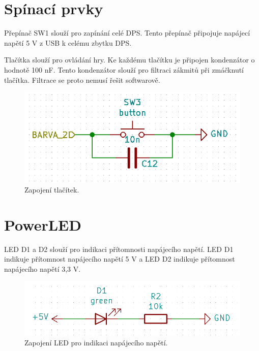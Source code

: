 \section{Spínací prvky}
Přepínač SW1 slouží pro zapínání celé DPS. Tento přepínač připojuje napájecí napětí 5 V z USB k celému zbytku DPS.

Tlačítka slouží pro ovládání hry. Ke každému tlačítku je připojen kondenzátor o hodnotě 100 nF. Tento kondenzátor 
slouží pro filtraci zákmitů při zmáčknutí tlačítka. Filtrace se proto nemusí řešit softwarově.

\begin{figure}[!h]
  \begin{center}
    \includegraphics[scale=0.8]{obrazky/Tlacitka_zapojeni.png}
  \end{center}
  \caption[Zapojení tlačítek]{Zapojení tlačítek.}
\end{figure}

\section{PowerLED}
LED D1 a D2 slouží pro indikaci přítomnosti napájecího napětí.  LED D1 indikuje přítomnost napájecího napětí 
5 V a LED D2 indikuje přítomnost napájecího napětí 3,3 V.

\begin{figure}[!h]
  \begin{center}
    \includegraphics[scale=0.5]{obrazky/powerLED.png}
  \end{center}
  \caption[Zapojení LED pro indikaci napájecího napětí]{Zapojení LED pro indikaci napájecího napětí.}
\end{figure}

